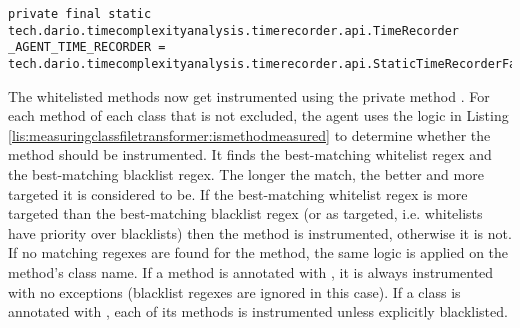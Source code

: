 \noindent\begin{minipage}[c]{\linewidth}
\begin{lstlisting}[breaklines,caption={$\_AGENT\_TIME\_RECORDER$ initialization},label=lis:measuringclassfiletransformer:agenttimerecorder]
private final static tech.dario.timecomplexityanalysis.timerecorder.api.TimeRecorder _AGENT_TIME_RECORDER = tech.dario.timecomplexityanalysis.timerecorder.api.StaticTimeRecorderFactory.getTimeRecorder();
\end{lstlisting}
\end{minipage}

\noindent The whitelisted methods now get instrumented using the private method . For each method of each class that is not excluded, the agent uses the logic in Listing \ref{lis:measuringclassfiletransformer:ismethodmeasured} to determine whether the method should be instrumented. It finds the best-matching whitelist regex and the best-matching blacklist regex. The longer the match, the better and more targeted it is considered to be. If the best-matching whitelist regex is more targeted than the best-matching blacklist regex (or as targeted, i.e. whitelists have priority over blacklists) then the method is instrumented, otherwise it is not. If no matching regexes are found for the method, the same logic is applied on the method's class name. \noindent If a method is annotated with , it is always instrumented with no exceptions (blacklist regexes are ignored in this case). If a class is annotated with , each of its methods is instrumented unless explicitly blacklisted.

